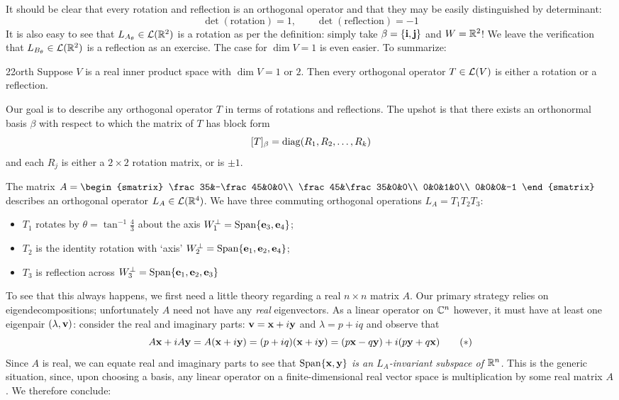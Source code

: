 It should be clear that every rotation and reflection is an orthogonal operator and that they may be easily distinguished by determinant:
\[\det(\text{rotation})=1,\qquad \det(\text{reflection})=-1\]
It is also easy to see that $L_{A_\theta}\in\mathcal{L}(\mathbb{R}^2)$ is a rotation as per the definition: simply take $\beta=\{{\mathbf{i}},{\mathbf{j}}\}$ and $W=\mathbb{R}^2$! We leave the verification that $L_{B_\theta}\in\mathcal{L}(\mathbb{R}^2)$ is a reflection as an exercise. The case for $\dim V=1$ is even easier. To summarize:

\begin{lemm}{}{22orth}
Suppose $V$ is a real inner product space with $\dim V=1$ or $2$. Then every orthogonal operator $T\in\mathcal{L}(V)$ is either a rotation or a reflection.
\end{lemm}


Our goal is to describe any orthogonal operator $T$ in terms of rotations and reflections. The upshot is that there exists an orthonormal basis $\beta$ with respect to which the matrix of $T$ has block form
\[[T]_\beta=\operatorname{diag}(R_1,R_2,\ldots,R_k)\]
and each $R_j$ is either a $2\times 2$ rotation matrix, or is $\pm 1$.

\begin{example}{}{}
The matrix $A=\begin{smatrix}
\frac 35&-\frac 45&0&0\\
\frac 45&\frac 35&0&0\\
0&0&1&0\\
0&0&0&-1
\end{smatrix}$ describes an orthogonal operator $L_A\in\mathcal{L}(\mathbb{R}^4)$. We have three commuting orthogonal operations $L_A=T_1T_2T_3$:
\begin{itemize}
  \item $T_1$ rotates by $\theta=\tan^{-1}\frac 43$ about the axis $W_1^\perp=\operatorname{Span}\{{\mathbf{e}}_3,{\mathbf{e}}_4\}$;
  \item $T_2$ is the identity rotation with `axis' $W_2^\perp=\operatorname{Span}\{{\mathbf{e}}_1,{\mathbf{e}}_2,{\mathbf{e}}_4\}$;
  \item $T_3$ is reflection across $W_3^\perp=\operatorname{Span}\{{\mathbf{e}}_1,{\mathbf{e}}_2,{\mathbf{e}}_3\}$
\end{itemize}
\end{example}

To see that this always happens, we first need a little theory regarding a real $n\times n$ matrix $A$. Our primary strategy relies on eigendecompositions; unfortunately $A$ need not have any \emph{real} eigenvectors. As a linear operator on $\mathbb{C}^n$ however, it must have at least one eigenpair $(\lambda,{\mathbf{v}})$: consider the real and imaginary parts: ${\mathbf{v}}={\mathbf{x}}+i{\mathbf{y}}$ and $\lambda=p+iq$ and observe that
\[A{\mathbf{x}}+iA{\mathbf{y}}=A({\mathbf{x}}+i{\mathbf{y}})=(p+iq)({\mathbf{x}}+i{\mathbf{y}})=(p{\mathbf{x}}-q{\mathbf{y}})+i(p{\mathbf{y}}+q{\mathbf{x}}) \tag{$\ast$}\]
Since $A$ is real, we can equate real and imaginary parts to see that $\operatorname{Span}\{{\mathbf{x}},{\mathbf{y}}\}$ \emph{is an $L_A$-invariant subspace of $\mathbb{R}^n$.} This is the generic situation, since, upon choosing a basis, any linear operator on a finite-dimensional real vector space is multiplication by some real matrix $A$. We therefore conclude:

